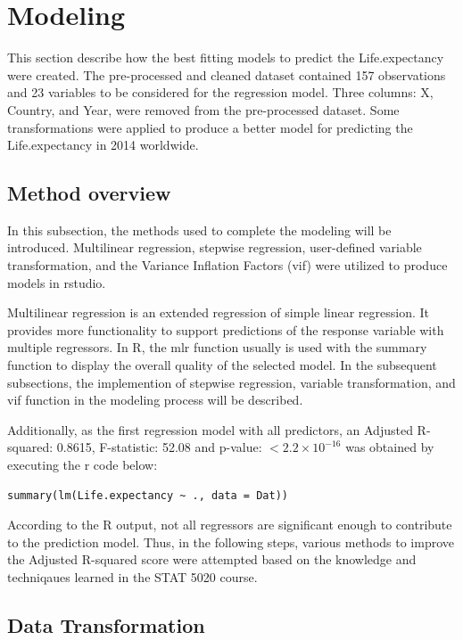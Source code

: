 \section{Modeling}
\label{sec:modeling}

This section describe how the best fitting models to predict the Life.expectancy were created. The pre-processed and cleaned dataset contained 157 observations and 23 variables to be considered for the regression model. Three columns: X, Country, and Year, were removed from the pre-processed dataset. Some transformations were applied to produce a better model for predicting the Life.expectancy in 2014 worldwide.

\subsection{Method overview}

In this subsection, the methods used to complete the modeling will be introduced. Multilinear regression, stepwise regression, user-defined variable transformation, and the Variance Inflation Factors (vif) were utilized to produce models in rstudio.

Multilinear regression is an extended regression of simple linear regression. It provides more functionality to support predictions of the response variable with multiple regressors. In R, the mlr function usually is used with the summary function to display the overall quality of the selected model. In the subsequent subsections, the implemention of stepwise regression, variable transformation, and vif function in the modeling process will be described.

Additionally, as the first regression model with all predictors, an Adjusted R-squared: 0.8615, F-statistic: 52.08 and p-value: $< 2.2\times 10^{-16}$ was obtained by executing the r code below:

\begin{verbatim}
summary(lm(Life.expectancy ~ ., data = Dat))
\end{verbatim}

According to the R output, not all regressors are significant enough to contribute to the prediction model. Thus, in the following steps, various methods to improve the Adjusted R-squared score were attempted based on the knowledge and techniqaues learned in the STAT 5020 course.

\subsection{Data Transformation}

